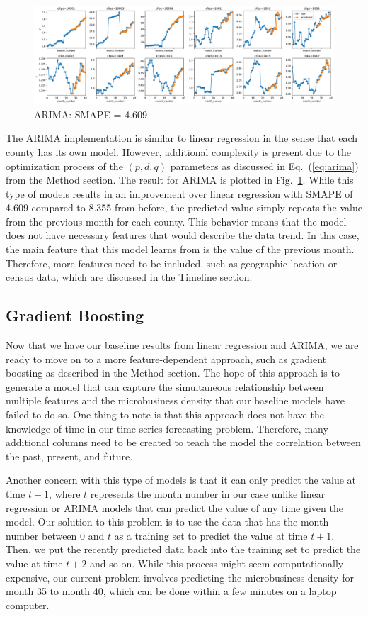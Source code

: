 \documentclass[prl,aps,superscriptaddress,twocolumn,10pt,nolongbibliography]{revtex4-2}
\begin{document}
\begin{figure}
\includegraphics[width=7in]{figs/arima.pdf}
\caption{\label{fig:arima}
ARIMA: SMAPE = 4.609
}
\end{figure}

The ARIMA implementation is similar to linear regression in the sense that each county has its own model. 
However, additional complexity is present due to the optimization process of the $(p, d, q)$ parameters as discussed in Eq.~(\ref{eq:arima}) from the Method section.
The result for ARIMA is plotted in Fig.~\ref{fig:arima}.
While this type of models results in an improvement over linear regression with SMAPE of 4.609 compared to 8.355 from before, the predicted value simply repeats the value from the previous month for each county.
This behavior means that the model does not have necessary features that would describe the data trend.
In this case, the main feature that this model learns from is the value of the previous month. 
Therefore, more features need to be included, such as geographic location or census data, which are discussed in the Timeline section.

\subsection{Gradient Boosting}
Now that we have our baseline results from linear regression and ARIMA, we are ready to move on to a more feature-dependent approach, such as gradient boosting as described in the Method section.
The hope of this approach is to generate a model that can capture the simultaneous relationship between multiple features and the microbusiness density that our baseline models have failed to do so. 
One thing to note is that this approach does not have the knowledge of time in our time-series forecasting problem. 
Therefore, many additional columns need to be created to teach the model the correlation between the past, present, and future.  

Another concern with this type of models is that it can only predict the value at time $t + 1$, where $t$ represents the month number in our case unlike linear regression or ARIMA models that can predict the value of any time given the model. 
Our solution to this problem is to use the data that has the month number between $0$ and $t$ as a training set to predict the value at time $t + 1$.
Then, we put the recently predicted data back into the training set to predict the value at time $t + 2$ and so on.
While this process might seem computationally expensive, our current problem involves predicting the microbusiness density for month 35 to month 40, which can be done within a few minutes on a laptop computer.
\end{document}
